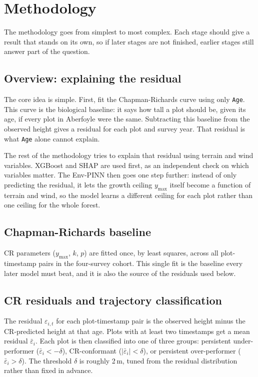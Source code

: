 \chapter{Methodology}
\label{ch:methodology}

The methodology goes from simplest to most complex. Each stage should give a result that stands on its own, so if later stages are not finished, earlier stages still answer part of the question.

\section{Overview: explaining the residual}

The core idea is simple. First, fit the Chapman-Richards curve using only \texttt{Age}. This curve is the biological baseline: it says how tall a plot should be, given its age, if every plot in Aberfoyle were the same. Subtracting this baseline from the observed height gives a residual for each plot and survey year. That residual is what \texttt{Age} alone cannot explain.

The rest of the methodology tries to explain that residual using terrain and wind variables. XGBoost and SHAP are used first, as an independent check on which variables matter. The Env-PINN then goes one step further: instead of only predicting the residual, it lets the growth ceiling $y_{\max}$ itself become a function of terrain and wind, so the model learns a different ceiling for each plot rather than one ceiling for the whole forest.

\section{Chapman-Richards baseline}

CR parameters ($y_{\max}$, $k$, $p$) are fitted once, by least squares, across all plot-timestamp pairs in the four-survey cohort. This single fit is the baseline every later model must beat, and it is also the source of the residuals used below.

\section{CR residuals and trajectory classification}

The residual $\varepsilon_{i,t}$ for each plot-timestamp pair is the observed height minus the CR-predicted height at that age. Plots with at least two timestamps get a mean residual $\bar{\varepsilon}_i$. Each plot is then classified into one of three groups: persistent under-performer ($\bar{\varepsilon}_i < -\delta$), CR-conformant ($|\bar{\varepsilon}_i| < \delta$), or persistent over-performer ($\bar{\varepsilon}_i > \delta$). The threshold $\delta$ is roughly 2\,m, tuned from the residual distribution rather than fixed in advance.

